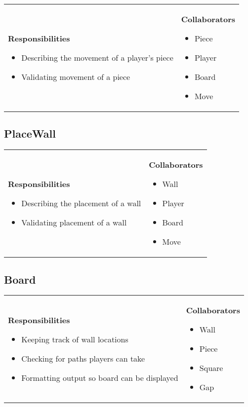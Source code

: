 \documentclass[a4paper]{article}
\begin{document}
\begin{tabular}{p{9cm}p{3cm}}
    \textbf{Responsibilities}
    \begin{itemize}
    \item Describing the movement of a player's piece
    \item Validating movement of a piece
    \end{itemize}
    &
    \textbf{Collaborators}
    \begin{itemize}
    \item Piece
    \item Player
    \item Board
    \item Move
    \end{itemize}
\end{tabular}

\subsection*{PlaceWall}

\begin{tabular}{p{9cm}p{3cm}}
    \textbf{Responsibilities}
    \begin{itemize}
    \item Describing the placement of a wall
    \item Validating placement of a wall
    \end{itemize}
    &
    \textbf{Collaborators}
    \begin{itemize}
    \item Wall
    \item Player
    \item Board
    \item Move
    \end{itemize}
\end{tabular}


\subsection*{Board}

\begin{tabular}{p{9cm}p{3cm}}
    \textbf{Responsibilities}
    \begin{itemize}
    \item Keeping track of wall locations
    \item Checking for paths players can take
    \item Formatting output so board can be displayed
    \end{itemize}
    &
    \textbf{Collaborators}
    \begin{itemize}
    \item Wall
    \item Piece
    \item Square
    \item Gap
    \end{itemize}
\end{tabular}
\end{document}
